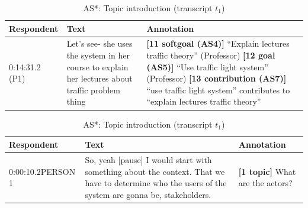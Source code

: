 \documentclass[11.5pt,two column]{llncs}
\begin{document}
\begin{table}[!htbp]
\begin{tabular}{|p{20mm}|p{50mm}|p{80mm}|}
\hline
Respondent & Text & Annotation\\
\hline
0:14:31.2 (P1) & Let's see- she uses the system in her course to explain her lectures about traffic problem thing & \textbf{[11 softgoal (AS4)]} ``Explain lectures traffic theory'' (Professor)\newline
\textbf{[12 goal (AS5)]} ``Use traffic light system'' (Professor)\newline
\textbf{[13 contribution (AS7)]} ``use traffic light system'' contributes to ``explain lectures traffic theory''\\
\hline
\end{tabular}
\caption{AS4: softgoal, AS5: goal, AS7: contribution (transcript $t_3$)}
\label{table:transcript:as4-as5-as7}

\begin{tabular}{|p{20mm}|p{90mm}|p{40mm}|}
\hline
Respondent & Text & Annotation\\
\hline
0:00:10.2\newline PERSON 1 & 	So, yeah [pause] I would start with something about the context. That we have to determine who the users of the system are gonna be, stakeholders. & \textbf{[1 topic]} What are the actors?\\
\hline
\end{tabular}
\caption{AS*: Topic introduction (transcript $t_1$)}
\label{table:transcript:as-star}
\end{table}
\end{document}

